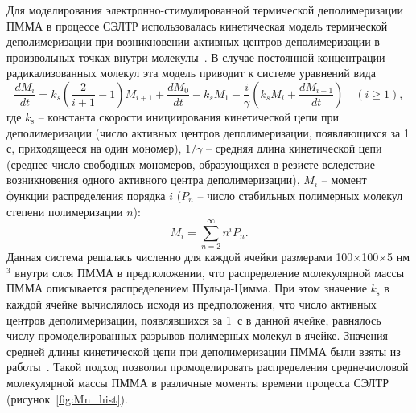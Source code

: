 Для моделирования электронно-стимулированной термической деполимеризации ПММА в процессе СЭЛТР использовалась кинетическая модель термической деполимеризации при возникновении активных центров деполимеризации в произвольных точках внутри молекулы~\cite{Boyd_3}.
В случае постоянной концентрации радикализованных молекул эта модель приводит к системе уравнений вида
\begin{equation} \label{eq:moment_equation}
	\frac{d M_i}{d t}=k_s\left(\frac{2}{i+1}-1\right) M_{i+1}+\frac{d M_0}{d t}-k_s M_1 - \frac{i}{\gamma}\left(k_s M_i+\frac{d M_{i-1}}{d t}\right) \quad(i \geq 1),
\end{equation}
где $k_\mathrm{s}$ -- константа скорости инициирования кинетической цепи при деполимеризации (число активных центров деполимеризации, появляющихся за 1 с, приходящееся на один мономер), $1/\gamma$ -- средняя длина кинетической цепи (среднее число свободных мономеров, образующихся в резисте вследствие возникновения одного активного центра деполимеризации), $M_i$ -- момент функции распределения порядка $i$ ($P_n$ -- число стабильных полимерных молекул степени полимеризации $n$):
\begin{equation}
	M_i=\sum_{n=2}^{\infty} n^i P_n.
\end{equation}
Данная система решалась численно для каждой ячейки размерами 100$\times$100$\times$5 нм$^3$ внутри слоя ПММА в предположении, что распределение молекулярной массы \linebreak ПММА описывается распределением Шульца-Цимма.
При этом значение $k_\mathrm{s}$ в каждой ячейке вычислялось исходя из предположения, что число активных центров деполимеризации, появлявшихся за 1~с в данной ячейке, равнялось числу промоделированных разрывов полимерных молекул в ячейке. Значения средней длины кинетической цепи при деполимеризации ПММА были взяты из работы~\cite{Mita_PMMA_zip_lengths_T}.
Такой подход позволил промоделировать распределения среднечисловой молекулярной массы ПММА в различные моменты времени процесса СЭЛТР (рисунок~\ref{fig:Mn_hist}).
